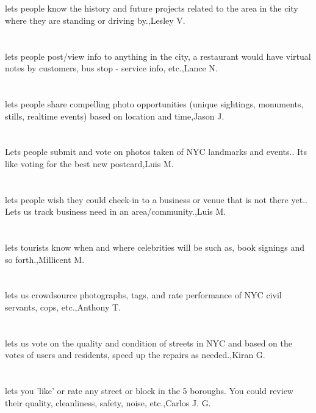 \section{}lets people know the history and future projects related to the area in the city where they are standing or driving by.,Lesley V.	
\section{}lets people post/view info to anything in the city, a restaurant would have virtual notes by customers, bus stop - service info, etc.,Lance N.	
\section{}lets people share compelling photo opportunities (unique sightings, monuments, stills, realtime events) based on location and time,Jason J.	
\section{}Lets people submit and vote on photos taken of NYC landmarks and events.. Its like voting for the best new postcard,Luis M.	
\section{}lets people wish they could check-in to a business or venue that is not there yet.. Lets us track business need in an area/community.,Luis M.	
\section{}lets tourists know when and where celebrities will be such as, book signings and so forth.,Millicent M.	
\section{}lets us crowdsource photographs, tags, and rate performance of NYC civil servants, cops, etc.,Anthony T.	
\section{}lets us vote on the quality and condition of streets in NYC and based on the votes of users and residents, speed up the repairs as needed.,Kiran G.	
\section{}lets you 'like' or rate any street or block in the 5 boroughs. You could review their quality, cleanliness, safety, noise, etc.,Carlos J.  G.	
